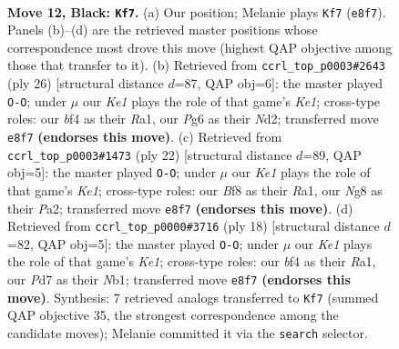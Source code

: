 \documentclass[11pt]{article}
\begin{document}
\clearpage

\begin{figure}[p]\centering
\begin{subfigure}{0.46\textwidth}\centering
\resizebox{\linewidth}{!}{%
\newchessgame
\chessboard[
  setfen={r2qkbnr/3p3p/n4pp1/2pP4/4PBPP/2N5/PP6/R2QK1NR b KQkq - 0 12},
  showmover=false,
  pgfstyle=straightmove, color=movearrow, markmove={e8-f7}
]}
\caption{}
\end{subfigure}\hfill
\begin{subfigure}{0.46\textwidth}\centering
\resizebox{\linewidth}{!}{%
\newchessgame
\chessboard[
  setfen={r1b1k2r/2pnq1pp/2p2p2/p3p3/P3P3/2P1B3/2PN1PPP/R2QK2R w KQkq - 0 14},
  showmover=false,
  pgfstyle=straightmove, color=movearrow, markmove={e1-g1}
]}
\caption{}
\end{subfigure}
\\[4pt]
\begin{subfigure}{0.46\textwidth}\centering
\resizebox{\linewidth}{!}{%
\newchessgame
\chessboard[
  setfen={r2q1rk1/pppb2pp/2n5/4pp2/8/2PPPNP1/P4PBP/R2QK2R w KQ - 1 12},
  showmover=false,
  pgfstyle=straightmove, color=movearrow, markmove={e1-g1}
]}
\caption{}
\end{subfigure}\hfill
\begin{subfigure}{0.46\textwidth}\centering
\resizebox{\linewidth}{!}{%
\newchessgame
\chessboard[
  setfen={rn2k2r/ppp1q1pp/3pb3/3n4/3Pp3/4N3/PPP1BPPP/RN1QK2R w KQkq - 0 10},
  showmover=false,
  pgfstyle=straightmove, color=movearrow, markmove={e1-g1}
]}
\caption{}
\end{subfigure}
\caption{\textbf{Move 12, Black: \texttt{Kf7}.} (a) Our position; Melanie plays \texttt{Kf7} (\texttt{e8f7}). Panels (b)--(d) are the retrieved master positions whose correspondence most drove this move (highest QAP objective among those that transfer to it). (b) Retrieved from \texttt{ccrl\_top\_p0003\#2643} (ply 26) [structural distance $d$=87, QAP obj=6]: the master played \texttt{O-O}; under $\mu$ our \emph{Ke1} plays the role of that game's \emph{Ke1}; cross-type roles: our \emph{b}f4 as their \emph{R}a1, our \emph{P}g6 as their \emph{N}d2; transferred move \texttt{e8f7} \textbf{(endorses this move)}. (c) Retrieved from \texttt{ccrl\_top\_p0003\#1473} (ply 22) [structural distance $d$=89, QAP obj=5]: the master played \texttt{O-O}; under $\mu$ our \emph{Ke1} plays the role of that game's \emph{Ke1}; cross-type roles: our \emph{B}f8 as their \emph{R}a1, our \emph{N}g8 as their \emph{P}a2; transferred move \texttt{e8f7} \textbf{(endorses this move)}. (d) Retrieved from \texttt{ccrl\_top\_p0000\#3716} (ply 18) [structural distance $d$=82, QAP obj=5]: the master played \texttt{O-O}; under $\mu$ our \emph{Ke1} plays the role of that game's \emph{Ke1}; cross-type roles: our \emph{b}f4 as their \emph{R}a1, our \emph{P}d7 as their \emph{N}b1; transferred move \texttt{e8f7} \textbf{(endorses this move)}. Synthesis: 7 retrieved analogs transferred to \texttt{Kf7} (summed QAP objective 35, the strongest correspondence among the candidate moves); Melanie committed it via the \texttt{search} selector.}
\label{fig:thought-m23}
\end{figure}
\end{document}
